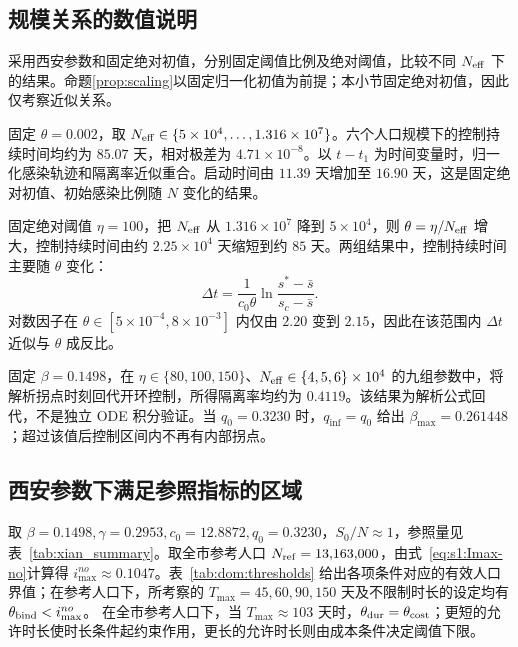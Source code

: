 \documentclass[lang=cn,a4paper,newtx]{elegantpaper}
\numberwithin{equation}{section}
\theoremstyle{plain}
\newcommand{\qinf}{q_{\mathrm{inf}}}
\begin{document}
\subsection{规模关系的数值说明}
\label{sec:scaling}
采用西安参数和固定绝对初值，分别固定阈值比例及绝对阈值，比较不同 $N_{\rm eff}$ 下的结果。命题\ref{prop:scaling}以固定归一化初值为前提；本小节固定绝对初值，因此仅考察近似关系。

固定 $\theta=0.002$，取 $N_{\rm eff}\in\{5\times10^4,\dots,1.316\times10^7\}$。六个人口规模下的控制持续时间均约为 $85.07$ 天，相对极差为 $4.71\times10^{-8}$。以 $t-t_1$ 为时间变量时，归一化感染轨迹和隔离率近似重合。启动时间由 $11.39$ 天增加至 $16.90$ 天，这是固定绝对初值、初始感染比例随 $N$ 变化的结果。

固定绝对阈值 $\eta=100$，把 $N_{\rm eff}$ 从 $1.316\times10^7$ 降到 $5\times10^4$，则 $\theta=\eta/N_{\rm eff}$ 增大，控制持续时间由约 $2.25\times10^4$ 天缩短到约 $85$ 天。两组结果中，控制持续时间主要随 $\theta$ 变化：
\[
\Delta t=\frac1{c_0\theta}\ln\frac{s^*-\bar s}{s_c-\bar s}.
\]
对数因子在 $\theta\in[5\times10^{-4},8\times10^{-3}]$ 内仅由 $2.20$ 变到 $2.15$，因此在该范围内 $\Delta t$ 近似与 $\theta$ 成反比。

固定 $\beta=0.1498$，在 $\eta\in\{80,100,150\}$、$N_{\rm eff}\in\{4,5,6\}\times10^4$ 的九组参数中，将解析拐点时刻回代开环控制，所得隔离率均约为 $0.4119$。该结果为解析公式回代，不是独立 ODE 积分验证。当 $q_0=0.3230$ 时，$\qinf=q_0$ 给出 $\beta_{\max}=0.261448$；超过该值后控制区间内不再有内部拐点。

\subsection{西安参数下满足参照指标的区域}
\label{sec:dom:xian}

取 $\beta=0.1498,\gamma=0.2953,c_0=12.8872,q_0=0.3230$，$S_0/N\approx1$，参照量见表~\ref{tab:xian_summary}。取全市参考人口 $N_{\rm ref}=13{,}163{,}000$，由式~\eqref{eq:s1:Imax-no}计算得 $i_{\max}^{no}\approx0.1047$。表~\ref{tab:dom:thresholds} 给出各项条件对应的有效人口界值；在参考人口下，所考察的 $T_{\max}=45,60,90,150$ 天及不限制时长的设定均有 $\theta_{\rm bind}<i_{\max}^{no}$。
在全市参考人口下，当 $T_{\max}\approx103$ 天时，$\theta_{\rm dur}=\theta_{\rm cost}$；更短的允许时长使时长条件起约束作用，更长的允许时长则由成本条件决定阈值下限。
\end{document}
